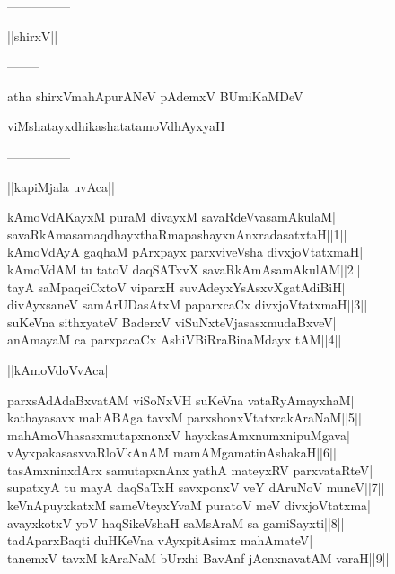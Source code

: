 \documentclass{article}
\begin{document}
\begin{center}
---------------
\end{center}

\begin{center}
||shirxV||
\end{center}

\begin{center}
--------
\end{center}

\begin{center}
atha shirxVmahApurANeV pAdemxV BUmiKaMDeV
\end{center}

\begin{center}
viMshatayxdhikashatatamoVdhAyxyaH
\end{center}

\begin{center}
---------------
\end{center}

\begin{center}
||kapiMjala uvAca||
\end{center}

kAmoVdAKayxM puraM divayxM savaRdeVvasamAkulaM|\\
savaRkAmasamaqdhayxthaRmapashayxnAnxradasatxtaH||1||\\
kAmoVdAyA gaqhaM pArxpayx parxviveVsha divxjoVtatxmaH|\\
kAmoVdAM tu tatoV daqSATxvX savaRkAmAsamAkulAM||2||\\
tayA saMpaqciCxtoV viparxH suvAdeyxYsAsxvXgatAdiBiH|\\
divAyxsaneV samArUDasAtxM paparxcaCx divxjoVtatxmaH||3||\\
suKeVna sithxyateV BaderxV viSuNxteVjasasxmudaBxveV|\\
anAmayaM ca parxpacaCx AshiVBiRraBinaMdayx tAM||4||\\

\begin{center}
||kAmoVdoVvAca||
\end{center}

parxsAdAdaBxvatAM viSoNxVH suKeVna vataRyAmayxhaM|\\
kathayasavx mahABAga tavxM parxshonxVtatxrakAraNaM||5||\\
mahAmoVhasasxmutapxnonxV hayxkasAmxnumxnipuMgava|\\
vAyxpakasasxvaRloVkAnAM mamAMgamatinAshakaH||6||\\
tasAmxninxdArx samutapxnAnx yathA mateyxRV parxvataRteV|\\
supatxyA tu mayA daqSaTxH savxponxV veY dAruNoV muneV||7||\\
keVnApuyxkatxM sameVteyxYvaM puratoV meV divxjoVtatxma|\\
avayxkotxV yoV haqSikeVshaH saMsAraM sa gamiSayxti||8||\\
tadAparxBaqti duHKeVna vAyxpitAsimx mahAmateV|\\
tanemxV tavxM kAraNaM bUrxhi BavAnf jAcnxnavatAM varaH||9||\\
\end{document}
